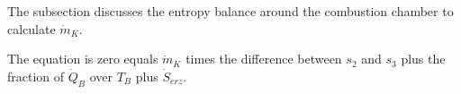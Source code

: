 The subsection discusses the entropy balance around the combustion chamber to calculate \(\dot{m}_K\).

The equation is zero equals \(\dot{m}_K\) times the difference between \(s_2\) and \(s_3\) plus the fraction of \(\dot{Q}_B\) over \(T_B\) plus \(\dot{S}_{erz}\).